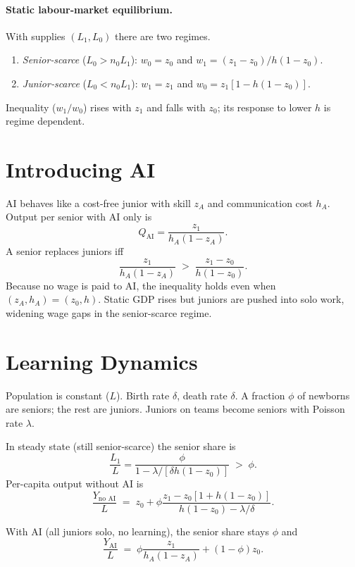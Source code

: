 \documentclass[12pt]{article}
\begin{document}
\paragraph{Static labour‐market equilibrium.}  With supplies $(L_{1},L_{0})$ there are two regimes.
\begin{enumerate}
    \item \emph{Senior‐scarce} ($L_{0}>n_{0}L_{1}$): $w_{0}=z_{0}$ and 
          $w_{1}=(z_{1}-z_{0})/h(1-z_{0})$.
    \item \emph{Junior‐scarce} ($L_{0}<n_{0}L_{1}$): $w_{1}=z_{1}$ and
          $w_{0}=z_{1}[1-h(1-z_{0})]$.
\end{enumerate}
Inequality ($w_{1}/w_{0}$) rises with $z_{1}$ and falls with $z_{0}$; its response to lower $h$ is regime dependent.

\section{Introducing AI}

AI behaves like a cost-free junior with skill $z_{A}$ and communication cost $h_{A}$.  
Output per senior with AI only is 
\[
Q_{\text{AI}}=\frac{z_{1}}{h_{A}(1-z_{A})}.
\]
A senior replaces juniors iff
\[
\frac{z_{1}}{h_{A}(1-z_{A})} \;>\; \frac{z_{1}-z_{0}}{h(1-z_{0})}.  \tag{Adoption}
\]
Because no wage is paid to AI, the inequality holds even when $(z_{A},h_{A})=(z_{0},h)$.
Static GDP rises but juniors are pushed into solo work, widening wage gaps in the senior-scarce regime.

\section{Learning Dynamics}

Population is constant ($L$).  Birth rate $\delta$, death rate $\delta$.
A fraction $\phi$ of newborns are seniors; the rest are juniors.
Juniors on teams become seniors with Poisson rate $\lambda$.

In steady state (still senior-scarce) the senior share is
\[
\frac{L_{1}}{L} = \frac{\phi}{1-\lambda/[\delta h(1-z_{0})]} \;>\;\phi.
\]
Per-capita output without AI is
\[
\frac{Y_{\text{no AI}}}{L} \;=\; z_{0}+\phi\frac{z_{1}-z_{0}[1+h(1-z_{0})]}
                                         {h(1-z_{0})-\lambda/\delta}.
\]

With AI (all juniors solo, no learning), the senior share stays $\phi$ and
\[
\frac{Y_{\text{AI}}}{L} \;=\; \phi\frac{z_{1}}{h_{A}(1-z_{A})} + (1-\phi)z_{0}.
\]
\end{document}
